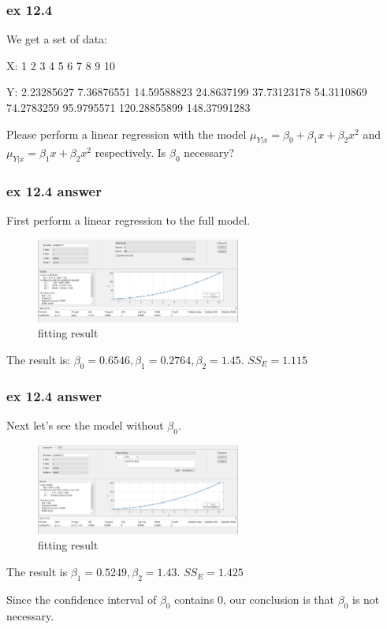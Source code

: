 \documentclass{beamer}
\begin{document}
\begin{frame}
    \frametitle{ex 12.4}

    We get a set of data:\par
    X: 1  2  3  4  5  6  7  8  9 10 \par
    Y: 2.23285627   7.36876551  14.59588823  24.8637199   37.73123178 54.3110869   74.2783259   95.9795571  120.28855899 148.37991283\par
    Please perform a linear regression with the model $\mu_{Y|x}=\beta_0+\beta_1 x+\beta_2 x^2$ and $\mu_{Y|x}=\beta_1 x+\beta_2 x^2$ respectively. Is $\beta_0$ necessary?

\end{frame}

\begin{frame}
    \frametitle{ex 12.4 answer}

    First perform a linear regression to the full model.
    \begin{figure}[H]
        \centering
        \includegraphics[width=0.6\textwidth,height=0.3\textwidth]{ex12_4_1.jpg}
        \caption{fitting result}
    \end{figure}\par
    The result is: $\beta_0=0.6546, \beta_1=0.2764, \beta_2=1.45$. $SS_E=1.115$

\end{frame}

\begin{frame}
    \frametitle{ex 12.4 answer}

    Next let's see the model without $\beta_0$.\par
    \begin{figure}[H]
        \centering
        \includegraphics[width=0.6\textwidth,height=0.3\textwidth]{ex12_4_2.jpg}
        \caption{fitting result}
    \end{figure}\par
    The result is $\beta_1=0.5249, \beta_2=1.43$. $SS_E=1.425$\par
    Since the confidence interval of $\beta_0$ contains 0, our conclusion is that $\beta_0$ is not necessary.

\end{frame}
\end{document}

